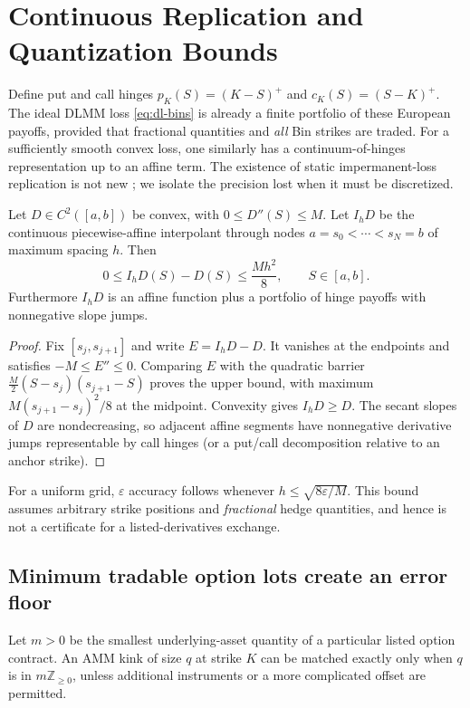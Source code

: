 \section{Continuous Replication and Quantization Bounds}
Define put and call hinges $p_K(S)=(K-S)^+$ and $c_K(S)=(S-K)^+$. The ideal DLMM loss \eqref{eq:dl-bins} is already a finite portfolio of these European payoffs, provided that fractional quantities and \emph{all} Bin strikes are traded. For a sufficiently smooth convex loss, one similarly has a continuum-of-hinges representation up to an affine term. The existence of static impermanent-loss replication is not new \cite{deng2023static}; we isolate the precision lost when it must be discretized.

\begin{proposition}
\label{prop:spline}
Let $D\in C^2([a,b])$ be convex, with $0\le D''(S)\le M$. Let $I_hD$ be the continuous piecewise-affine interpolant through nodes $a=s_0<\cdots<s_N=b$ of maximum spacing $h$. Then
\begin{equation}
 0\le I_hD(S)-D(S)\le\frac{Mh^2}{8},\qquad
 S\in[a,b].
\label{eq:interpolation}
\end{equation}
Furthermore $I_hD$ is an affine function plus a portfolio of hinge payoffs with nonnegative slope jumps.
\end{proposition}
\begin{proof}
Fix $[s_j,s_{j+1}]$ and write $E=I_hD-D$. It vanishes at the endpoints and satisfies $-M\le E''\le0$. Comparing $E$ with the quadratic barrier $\tfrac M2(S-s_j)(s_{j+1}-S)$ proves the upper bound, with maximum $M(s_{j+1}-s_j)^2/8$ at the midpoint. Convexity gives $I_hD\ge D$. The secant slopes of $D$ are nondecreasing, so adjacent affine segments have nonnegative derivative jumps representable by call hinges (or a put/call decomposition relative to an anchor strike).
\end{proof}
For a uniform grid, $\varepsilon$ accuracy follows whenever $h\le\sqrt{8\varepsilon/M}$. This bound assumes arbitrary strike positions and \emph{fractional} hedge quantities, and hence is not a certificate for a listed-derivatives exchange.

\subsection{Minimum tradable option lots create an error floor}
Let $m>0$ be the smallest underlying-asset quantity of a particular listed option contract. An AMM kink of size $q$ at strike $K$ can be matched exactly only when $q$ is in $m\mathbb{Z}_{\ge0}$, unless additional instruments or a more complicated offset are permitted.

